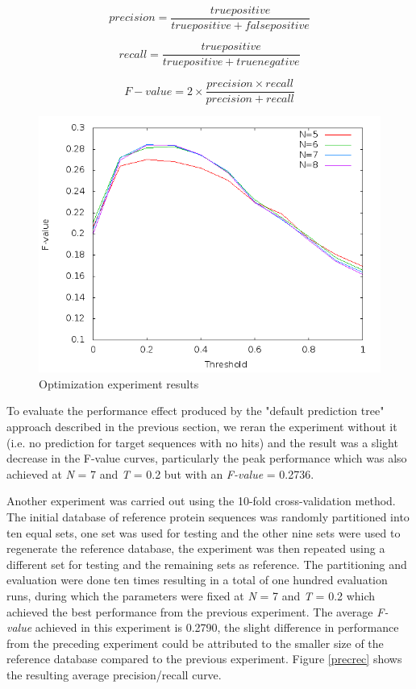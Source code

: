\documentclass{bioinfo}
\begin{document}
\begin{equation}
precision = \frac{true positive}{true positive + false positive}
\label{eq:02}
\end{equation}

\begin{equation}
recall = \frac{true positive}{true positive + true negative}
\label{eq:03}
\end{equation}

\begin{equation}
F-value = 2\times\frac{precision \times recall}{precision + recall}
\label{eq:04}
\end{equation}

\begin{figure}[!tpb]
\centerline{\includegraphics[scale=0.4]{bilder/optim.png}}
\caption{Optimization experiment results}
\label{optim}
\end{figure}

To evaluate the performance effect produced by the "default prediction tree" approach described in the previous section, we reran the experiment without it (i.e. no prediction for target sequences with no hits) and the result was a slight decrease in the F-value curves, particularly the peak performance which was also achieved at \textit{N} = 7 and \textit{T} = 0.2 but with an \textit{F-value} = 0.2736.

Another experiment was carried out using the 10-fold cross-validation method. The initial database of reference protein sequences was randomly partitioned into ten equal sets, one set was used for testing and the other nine sets were used to regenerate the reference database, the experiment was then repeated using a different set for testing and the remaining sets as reference. The partitioning and evaluation were done ten times resulting in a total of one hundred evaluation runs, during which the parameters were fixed at \textit{N} = 7 and \textit{T} = 0.2 which achieved the best performance from the previous experiment. The average \textit{F-value} achieved in this experiment is 0.2790, the slight difference in performance from the preceding experiment could be attributed to the smaller size of the reference database compared to the previous experiment. Figure \ref{precrec} shows the resulting average precision/recall curve.
\end{document}
